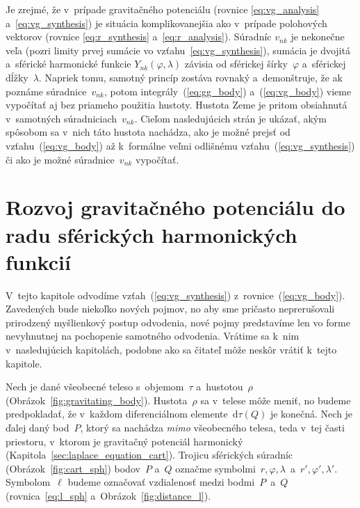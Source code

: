 \documentclass[a4paper, 12pt]{book}
\newcommand{\diff}{\mathrm d}
\begin{document}
Je zrejmé, že v~prípade gravitačného potenciálu (rovnice \ref{eq:vg_analysis}
a~\ref{eq:vg_synthesis}) je situácia komplikovanejšia ako v~prípade polohových
vektorov (rovnice \ref{eq:r_synthesis} a~\ref{eq:r_analysis}).  Súradníc
$v_{nk}$ je nekonečne veľa (pozri limity prvej sumácie vo
vzťahu~\ref{eq:vg_synthesis}), sumácia je dvojitá a~sférické harmonické funkcie
$Y_{nk}(\varphi, \lambda)$ závisia od sférickej šírky~$\varphi$ a~sférickej
dĺžky~$\lambda$.  Napriek tomu, samotný princíp zostáva rovnaký a~demonštruje, 
že ak poznáme súradnice~$v_{nk}$, potom
integrály~(\ref{eq:gg_body}) a~(\ref{eq:vg_body}) vieme vypočítať aj bez
priameho použitia hustoty.  Hustota Zeme je pritom obsiahnutá v~samotných
súradniciach~$v_{nk}$.  Cieľom nasledujúcich strán je ukázať, akým spôsobom sa
v~nich táto hustota nachádza, ako je možné prejsť od vzťahu~(\ref{eq:vg_body})
až k~formálne veľmi odlišnému vzťahu~(\ref{eq:vg_synthesis}) či ako je možné
súradnice~$v_{nk}$ vypočítať.



\section{Rozvoj gravitačného potenciálu do radu sférických harmonických
funkcií}
\label{sec:vg_sh_expansion}

V~tejto kapitole odvodíme vzťah~(\ref{eq:vg_synthesis})
z~rovnice~(\ref{eq:vg_body}).  Zavedených bude niekoľko nových pojmov, no aby 
sme pričasto neprerušovali prirodzený myšlienkový postup odvodenia, nové pojmy
predstavíme len vo forme nevyhnutnej na pochopenie samotného odvodenia.
Vrátime sa k~nim v~nasledujúcich kapitolách, podobne ako sa čitateľ môže neskôr 
vrátiť k~tejto kapitole.

Nech je dané všeobecné teleso s~objemom~$\tau$ a~hustotou~$\rho$
(Obrázok~\ref{fig:gravitating_body}).  Hustota~$\rho$ sa v~telese môže meniť,
no budeme predpokladať, že v~každom diferenciálnom elemente~$\diff \tau(Q)$ je
konečná.  Nech je ďalej daný bod~$P$, ktorý sa nachádza \emph{mimo} všeobecného
telesa, teda v~tej časti priestoru, v~ktorom je gravitačný potenciál harmonický
(Kapitola~\ref{sec:laplace_equation_cart}).  Trojicu sférických súradníc 
(Obrázok~\ref{fig:cart_sph}) bodov~$P$ a~$Q$ označme symbolmi~$r, \varphi,
\lambda$~a~$r', \varphi', \lambda'$.  Symbolom~$\ell$ budeme označovať 
vzdialenosť medzi bodmi~$P$~a~$Q$ (rovnica~\ref{eq:l_sph} 
a~Obrázok~\ref{fig:distance_l}).
\end{document}
